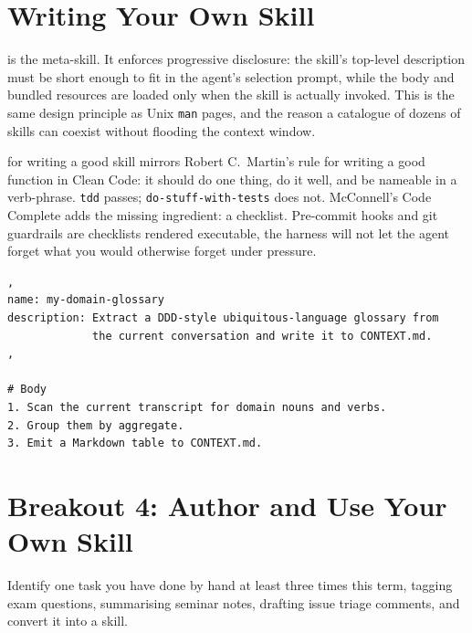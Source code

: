 \documentclass{../sharedAssets/tufte}
\begin{document}
\section{Writing Your Own Skill}
\label{sec:write-a-skill}

 is the meta-skill. It enforces
progressive disclosure: the skill's top-level description must be
short enough to fit in the agent's selection prompt, while the body and
bundled resources are loaded only when the skill is actually invoked.
This is the same design principle as Unix \texttt{man} pages, and
the reason a catalogue of dozens of skills can coexist without flooding
the context window.

 for writing a good skill mirrors
Robert C.\ Martin's rule for writing a good function in
Clean Code\cite{martin2008clean}: it should do one thing,
do it well, and be nameable in a verb-phrase. \texttt{tdd} passes;
\texttt{do-stuff-with-tests} does not. McConnell's
Code Complete\cite{mcconnell2004complete} adds the missing
ingredient: a checklist. Pre-commit hooks and git guardrails are
checklists rendered executable, the harness will not let the agent
forget what you would otherwise forget under pressure.

\begin{fullwidth}
\begin{verbatim}
, 
name: my-domain-glossary
description: Extract a DDD-style ubiquitous-language glossary from
             the current conversation and write it to CONTEXT.md.
, 

# Body
1. Scan the current transcript for domain nouns and verbs.
2. Group them by aggregate.
3. Emit a Markdown table to CONTEXT.md.
\end{verbatim}
\end{fullwidth}

\section{Breakout 4: Author and Use Your Own Skill}
\label{sec:breakout-4}

 Identify one task you have done by hand at
least three times this term, tagging exam questions, summarising
seminar notes, drafting issue triage comments, and convert it into a
skill.
\end{document}
